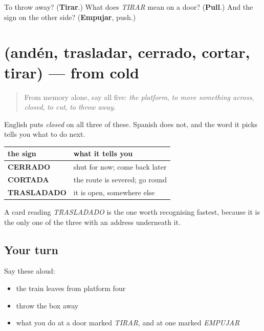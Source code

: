 \begin{tcolorbox}[breakable,colback=teal!4,colframe=teal!35!black,title={Before you move on}]
To throw away? (\textbf{Tirar}.) What does \emph{TIRAR} mean on a door? (\textbf{Pull}.) And the sign on the other side? (\textbf{Empujar}, push.)
\end{tcolorbox}
\section[(andén, trasladar, cerrado, cortar …]{(andén, trasladar, cerrado, cortar, tirar) — from cold}

\label{lesson:ES-R439-repaso-via}



\begin{quote}
From memory alone, say all five: \emph{the platform}, \emph{to move something across}, \emph{closed}, \emph{to cut}, \emph{to throw away}.
\end{quote}

\begin{grammarlens}[title={Grammar Lens: three signs that stop you, and they are not the same}]
English puts \emph{closed} on all three of these. Spanish does not, and the word it picks tells you what to do next.

\noindent
\begin{tabularx}{\linewidth}{@{}>{\raggedright\arraybackslash}X>{\raggedright\arraybackslash}X@{}}
\toprule
\textbf{the sign} & \textbf{what it tells you} \\
\midrule
\textbf{CERRADO} & shut for now; come back later \\
\textbf{CORTADA} & the route is severed; go round \\
\textbf{TRASLADADO} & it is open, somewhere else \\
\bottomrule
\end{tabularx}

A card reading \emph{TRASLADADO} is the one worth recognising fastest, because it is the only one of the three with an address underneath it.
\end{grammarlens}

\subsection*{Your turn}
Say these aloud:

\begin{itemize}
\raggedright
  \item the train leaves from platform four
  \item throw the box away
  \item what you do at a door marked \emph{TIRAR}, and at one marked \emph{EMPUJAR}
\end{itemize}

